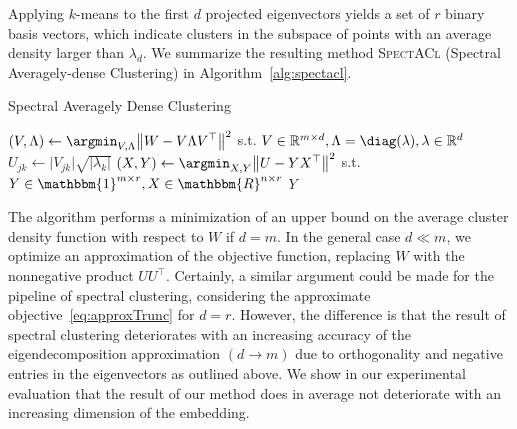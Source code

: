 Applying $k$-means to the first $d$ projected eigenvectors yields a set of $r$ binary basis vectors, which indicate clusters in the subspace of points with an average density larger than $\lambda_d$. We summarize the resulting method \textsc{SpectACl} (Spectral Averagely-dense Clustering) in Algorithm~\ref{alg:spectacl}.
\begin{algorithm}[t]
\caption{Spectral Averagely Dense Clustering} 
\begin{algorithmic}[1]
   
  \State $\displaystyle (V,\Lambda)\gets \argmin_{V,\Lambda} \bigl\lVert W-V\Lambda V^\top\bigr\rVert ^2$ s.t. $V\in \mathbb{R}^{m\times d}, \Lambda=\diag(\mathbf{\lambda}), \mathbf{\lambda}\in\mathbb{R}^d$ \label{alg:spectacl:truncEig}
  \State $U_{jk}\gets\lvert V_{jk}\rvert \sqrt{\lvert \lambda_k\rvert }$ 
  \State $\displaystyle (X,Y)\gets \argmin_{X,Y}\bigl\lVert U-YX^\top\bigr\rVert ^2$ s.t. $Y\in\mathbbm{1}^{m\times r}, X\in\mathbbm{R}^{n\times r}$ 
  \State \Return $Y$
  \EndFunction
\end{algorithmic}
\label{alg:spectacl}
\end{algorithm}
The algorithm performs a minimization of an upper bound on the average cluster density function with respect to $W$ if $d=m$. In the general case $d\ll m$, we optimize an approximation of the objective function, replacing $W$ with the nonnegative product $UU^\top$. Certainly, a similar argument could be made for the pipeline of spectral clustering, considering the approximate objective~\eqref{eq:approxTrunc} for $d=r$. However, the difference is that the result of spectral clustering deteriorates with an increasing accuracy of the eigendecomposition approximation $(d\rightarrow m)$ due to orthogonality and negative entries in the eigenvectors as outlined above. We show in our experimental evaluation that the result of our method does in average not deteriorate with an increasing dimension of the embedding.

